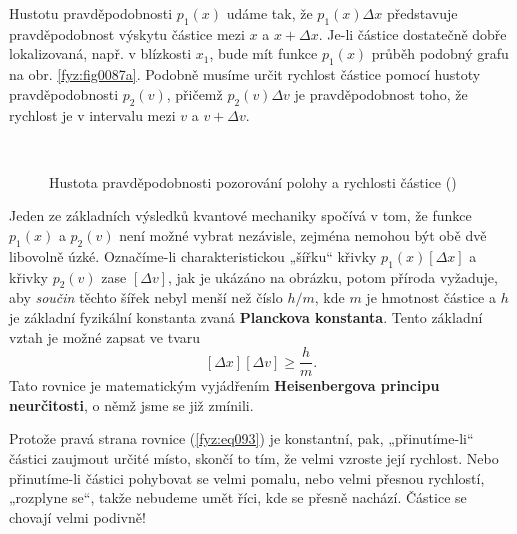     Hustotu pravděpodobnosti \(p_1(x)\) udáme tak, že \(p_1(x)\Delta x\) představuje 
    pravděpodobnost výskytu částice mezi \(x\) a \(x+ \Delta x\). Je-li částice dostatečně dobře 
    lokalizovaná, např. v blízkosti \(x_1\), bude mít funkce \(p_1(x)\) průběh podobný grafu na 
    obr. \ref{fyz:fig0087a}. Podobně musíme určit rychlost částice pomocí hustoty pravděpodobnosti 
    \(p_2(v)\), přičemž \(p_2(v)\Delta v\) je pravděpodobnost toho, že rychlost je v intervalu mezi 
    \(v\) a \(v+\Delta v\).
    
    \begin{figure}[ht!]  %
      \centering
                    \\
      \caption{Hustota pravděpodobnosti pozorování polohy a rychlosti částice  
               (\cite[s.~89]{Feynman01})}
      \label{fyz:fig0087}
    \end{figure}
    
    Jeden ze základních výsledků kvantové mechaniky spočívá v tom, že funkce \(p_1(x)\) a 
    \(p_2(v)\) není možné vybrat nezávisle, zejména nemohou být obě dvě libovolně úzké. Označíme-li 
    charakteristickou „šířku“ křivky \(p_1(x)[\Delta x]\) a křivky \(p_2(v)\) zase \([\Delta v]\), 
    jak je ukázáno na obrázku, potom příroda vyžaduje, aby \emph{součin} těchto šířek nebyl menší 
    než číslo \(h/m\), kde \(m\) je hmotnost částice a \(h\) je základní fyzikální konstanta zvaná 
    \textbf{Planckova konstanta}. Tento základní vztah je možné zapsat ve tvaru
    \begin{equation}\label{fyz:eq093}
      [\Delta x][\Delta v]\geq\frac{h}{m}.
    \end{equation}
    Tato rovnice je matematickým vyjádřením \textbf{Heisenbergova principu neurčitosti}, o němž 
    jsme se již zmínili.
    
    Protože pravá strana rovnice (\ref{fyz:eq093}) je konstantní, pak, „přinutíme-li“ částici 
    zaujmout určité místo, skončí to tím, že velmi vzroste její rychlost. Nebo přinutíme-li částici 
    pohybovat se velmi pomalu, nebo velmi přesnou rychlostí, „rozplyne se“, takže nebudeme umět 
    říci, kde se přesně nachází. Částice se chovají velmi podivně!
    
